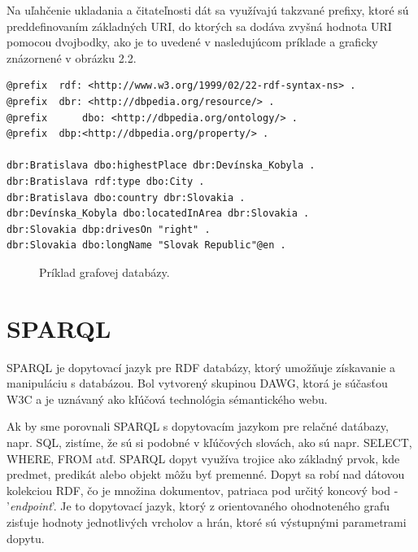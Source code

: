 \documentclass[12pt, a4paper, oneside]{book}
\begin{document}
Na uľahčenie ukladania a čitateľnosti dát sa využívajú takzvané prefixy, ktoré sú preddefinovaním základných URI, do ktorých sa dodáva zvyšná hodnota URI pomocou dvojbodky, ako je to uvedené v nasledujúcom príklade a graficky znázornené v obrázku 2.2.
\begin{verbatim}
@prefix  rdf: <http://www.w3.org/1999/02/22-rdf-syntax-ns> .
@prefix	 dbr: <http://dbpedia.org/resource/> .
@prefix 	 dbo: <http://dbpedia.org/ontology/> .
@prefix  dbp:<http://dbpedia.org/property/> .

dbr:Bratislava dbo:highestPlace dbr:Devínska_Kobyla .
dbr:Bratislava rdf:type dbo:City .
dbr:Bratislava dbo:country dbr:Slovakia .
dbr:Devínska_Kobyla dbo:locatedInArea dbr:Slovakia .
dbr:Slovakia dbp:drivesOn "right" .
dbr:Slovakia dbo:longName "Slovak Republic"@en .
\end{verbatim}

\begin{figure}[h]
\label{fig:semantic_web}
\caption{Príklad grafovej databázy.}
\end{figure}

\section{SPARQL}
SPARQL \cite{sparql} je dopytovací jazyk pre RDF databázy, ktorý umožňuje získavanie a manipuláciu s databázou. Bol vytvorený skupinou DAWG, ktorá je súčasťou W3C a je uznávaný ako kľúčová technológia sémantického webu. 


\quad Ak by sme porovnali SPARQL s dopytovacím jazykom pre relačné datábazy, napr. SQL, zistíme, že sú si podobné v kľúčových slovách, ako sú napr. SELECT, WHERE, FROM atď. SPARQL dopyt využíva trojice ako základný prvok, kde predmet, predikát alebo objekt môžu byť premenné. Dopyt sa robí nad dátovou kolekciou RDF, čo je množina dokumentov, patriaca pod určitý koncový bod - '\textit{endpoint}'. Je to dopytovací jazyk, ktorý z orientovaného ohodnoteného grafu zisťuje hodnoty jednotlivých vrcholov a hrán, ktoré sú výstupnými parametrami dopytu.
\end{document}
